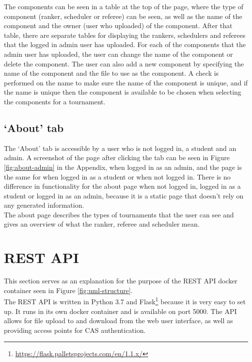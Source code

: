 \documentclass[a4paper, 12pt]{report}
\begin{document}
The components can be seen in a table at the top of the page, where the type of
component (ranker, scheduler or referee) can be seen, as well as the name of the
component and the owner (user who uploaded) of the component. After that table,
there are separate tables for displaying the rankers, schedulers and referees
that the logged in admin user has uploaded. For each of the components that the
admin user has uploaded, the user can change the name of the component or delete
the component. The user can also add a new component by specifying the name of the
component and the file to use as the component. A check is performed on the name
to make sure the name of the component is unique, and if the name is unique then
the component is available to be chosen when selecting the components for a
tournament.

\subsection{`About' tab}
\label{sec:impl-tab-about}

The `About' tab is accessible by a user who is not logged in, a student
and an admin. A screenshot of the page after clicking the tab can be seen in
Figure \ref{fig:about-admin} in the Appendix, when logged in as an admin,
and the page is the same for when logged in as a student or when not logged in.
There is no difference in functionality for the about page when not logged in,
logged in as a student or logged in as an admin, because it is a static page
that doesn't rely on any generated information. \\

The about page describes the types of tournaments that the user can see and
gives an overview of what the ranker, referee and scheduler mean.

\section{REST API}

This section serves as an explanation for the purpose of the REST API docker
container seen in Figure \ref{fig:uml-structure}. \\

The REST API is written in Python 3.7 and Flask\footnote{\url{https://flask.palletsprojects.com/en/1.1.x/}}
because it is very easy to set up. It runs in its own docker container and is
available on port 5000. The API allows for file upload to and download from the
web user interface, as well as providing access points for CAS authentication. \\
\end{document}
